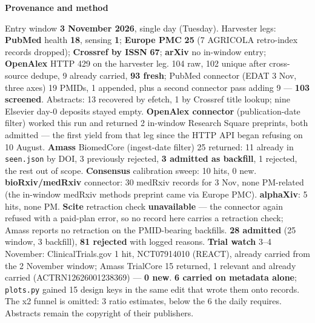 \documentclass[10pt]{article}
\begin{document}
\begin{keybox}
{\sffamily\bfseries\footnotesize\color{Deep}Provenance and method}\\[1.2mm]
{\fontsize{7.2}{8.8}\selectfont
Entry window \textbf{3 November 2026}, single day (Tuesday). Harvester legs: \textbf{PubMed} health \textbf{18}, sensing \textbf{1}; \textbf{Europe PMC} \textbf{25} (7 AGRICOLA retro-index records dropped); \textbf{Crossref by ISSN} \textbf{67}; \textbf{arXiv} no in-window entry; \textbf{OpenAlex} HTTP 429 on the harvester leg. 104 raw, 102 unique after cross-source dedupe, 9 already carried, \textbf{93 fresh}; PubMed connector (EDAT 3 Nov, three axes) 19 PMIDs, 1 appended, plus a second connector pass adding 9 --- \textbf{103 screened}. Abstracts: 13 recovered by efetch, 1 by Crossref title lookup; nine Elsevier day-0 deposits stayed empty.
\textbf{OpenAlex connector} (publication-date filter) worked this run and returned 2 in-window Research Square preprints, both admitted --- the first yield from that leg since the HTTP API began refusing on 10 August. \textbf{Amass} BiomedCore (ingest-date filter) 25 returned: 11 already in \texttt{seen.json} by DOI, 3 previously rejected, \textbf{3 admitted as backfill}, 1 rejected, the rest out of scope. \textbf{Consensus} calibration sweep: 10 hits, 0 new. \textbf{bioRxiv/medRxiv} connector: 30 medRxiv records for 3 Nov, none PM-related (the in-window medRxiv methods preprint came via Europe PMC). \textbf{alphaXiv}: 5 hits, none PM. \textbf{Scite} retraction check \textbf{unavailable} --- the connector again refused with a paid-plan error, so no record here carries a retraction check; Amass reports no retraction on the PMID-bearing backfills.
\textbf{28 admitted} (25 window, 3 backfill), \textbf{81 rejected} with logged reasons. \textbf{Trial watch} 3--4 November: ClinicalTrials.gov 1 hit, NCT07914010 (REACT), already carried from the 2 November window; Amass TrialCore 15 returned, 1 relevant and already carried (ACTRN12626001238369) --- \textbf{0 new}. \textbf{6 carried on metadata alone}; \texttt{plots.py} gained 15 design keys in the same edit that wrote them onto records. The x2 funnel is omitted: 3 ratio estimates, below the 6 the daily requires.
Abstracts remain the copyright of their publishers.\par}
\end{keybox}
\end{document}
